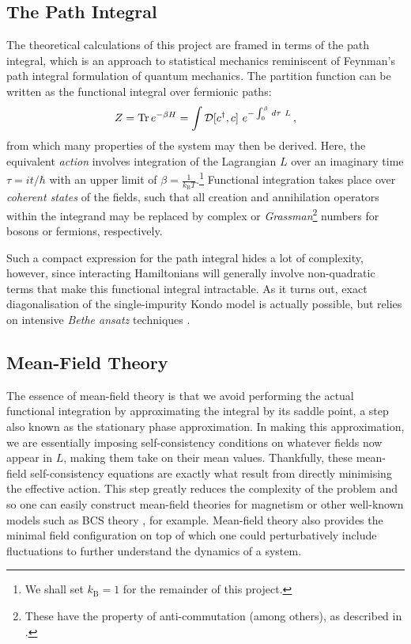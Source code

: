 
\subsection{The Path Integral}

The theoretical calculations of this project are framed in terms of the path integral, which is an approach to statistical mechanics reminiscent of Feynman's path integral formulation of quantum mechanics. The partition function can be written as the functional integral over fermionic paths: $$ Z = \operatorname{Tr}{e^{- \beta H}} = \int \mathcal{D} [c^\dagger, c]~e^{-\int_{0}^{\beta} \,d\tau~L}\,, $$ from which many properties of the system may then be derived. Here, the equivalent \emph{action} involves integration of the Lagrangian $ L $ over an imaginary time $ \tau = i t / \hbar $ with an upper limit of $ \beta = \frac{1}{k_{\text{B}} T} $.\footnote{We shall set $ k_{\text{B}} = 1 $ for the remainder of this project.} Functional integration takes place over \emph{coherent states} of the fields, such that all creation and annihilation operators within the integrand may be replaced by complex or \emph{Grassman}\footnote{These have the property of anti-commutation (among others), as described in \cite{ManyBodyPhysics}.} numbers for bosons or fermions, respectively.

Such a compact expression for the path integral hides a lot of complexity, however, since interacting Hamiltonians will generally involve non-quadratic terms that make this functional integral intractable. As it turns out, exact diagonalisation of the single-impurity Kondo model is actually possible, but relies on intensive \emph{Bethe ansatz} techniques \cite{BetheAnsatz}.

\subsection{Mean-Field Theory}

The essence of mean-field theory is that we avoid performing the actual functional integration by approximating the integral by its saddle point, a step also known as the stationary phase approximation. In making this approximation, we are essentially imposing self-consistency conditions on whatever fields now appear in $ L $, making them take on their mean values. Thankfully, these mean-field self-consistency equations are exactly what result from directly minimising the effective action. This step greatly reduces the complexity of the problem and so one can easily construct mean-field theories for magnetism or other well-known models such as BCS theory \cite{ManyBodyPhysics}, for example. Mean-field theory also provides the minimal field configuration on top of which one could perturbatively include fluctuations to further understand the dynamics of a system.

